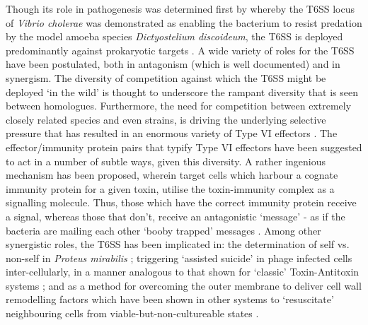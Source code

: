 Though its role in pathogenesis was determined first by \cite{Pukatzki2006} whereby the T6SS locus of \emph{Vibrio cholerae} was demonstrated as enabling the bacterium to resist predation by the model amoeba species \emph{Dictyostelium discoideum}, the T6SS is deployed predominantly against prokaryotic targets \citep{Green2015, Russell2014, Hood2010}. A wide variety of roles for the T6SS have been postulated, both in antagonism (which is well documented) and in synergism. The diversity of competition against which the T6SS might be deployed `in the wild' is thought to underscore the rampant diversity that is seen between homologues. Furthermore, the need for competition between extremely closely related species and even strains, is driving the underlying selective pressure that has resulted in an enormous variety of Type VI effectors \citep{English2012, Russell2012}. The effector/immunity protein pairs that typify Type VI effectors have been suggested to act in a number of subtle ways, given this diversity. A rather ingenious mechanism has been proposed, wherein target cells which harbour a cognate immunity protein for a given toxin, utilise the toxin-immunity complex as a signalling molecule. Thus, those which have the correct immunity protein receive a signal, whereas those that don't, receive an antagonistic `message' - as if the bacteria are mailing each other `booby trapped' messages \citep{Russell2014}. Among other synergistic roles, the T6SS has been implicated in: the determination of self vs. non-self in \emph{Proteus mirabilis} \citep{Gibbs2008, Wenren2013}; triggering `assisted suicide' in phage infected cells inter-cellularly, in a manner analogous to that shown for `classic' Toxin-Antitoxin systems \citep{Hazan2004}; and as a method for overcoming the outer membrane to deliver cell wall remodelling factors which have been shown in other systems to `resuscitate' neighbouring cells from viable-but-non-cultureable states \citep{Downing2005, Mukamolova2006}.



